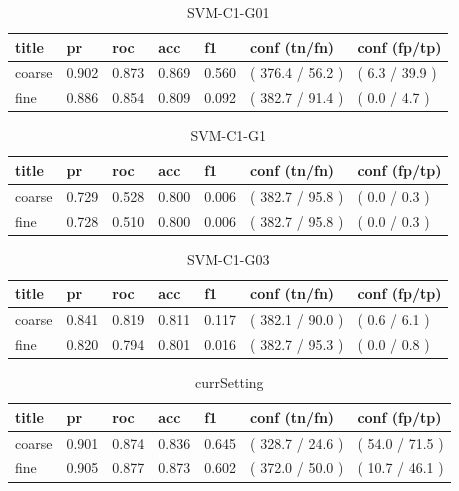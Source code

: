 \documentclass[ms]{nuthesis}
\begin{document}
\FloatBarrier
\begin{table}[h]
\centering
\begin{tabular}{|l||l||l||l||l||l||l|}\toprule
title & pr & roc & acc & f1 & conf (tn/fn) & conf (fp/tp) \\ \midrule
coarse & 0.902 & 0.873 & 0.869 & 0.560 & ( 376.4 / 56.2 ) & ( 6.3 / 39.9 ) \\
fine & 0.886 & 0.854 & 0.809 & 0.092 & ( 382.7 / 91.4 ) & ( 0.0 / 4.7 ) \\ \bottomrule
\end{tabular}
\caption{SVM-C1-G01}
\label{tab:SVM-C1-G01}
\end{table}
\FloatBarrier

\FloatBarrier
\begin{table}[h]
\centering
\begin{tabular}{|l||l||l||l||l||l||l|}\toprule
title & pr & roc & acc & f1 & conf (tn/fn) & conf (fp/tp) \\ \midrule
coarse & 0.729 & 0.528 & 0.800 & 0.006 & ( 382.7 / 95.8 ) & ( 0.0 / 0.3 ) \\
fine & 0.728 & 0.510 & 0.800 & 0.006 & ( 382.7 / 95.8 ) & ( 0.0 / 0.3 ) \\ \bottomrule
\end{tabular}
\caption{SVM-C1-G1}
\label{tab:SVM-C1-G1}
\end{table}
\FloatBarrier

\FloatBarrier
\begin{table}[h]
\centering
\begin{tabular}{|l||l||l||l||l||l||l|}\toprule
title & pr & roc & acc & f1 & conf (tn/fn) & conf (fp/tp) \\ \midrule
coarse & 0.841 & 0.819 & 0.811 & 0.117 & ( 382.1 / 90.0 ) & ( 0.6 / 6.1 ) \\
fine & 0.820 & 0.794 & 0.801 & 0.016 & ( 382.7 / 95.3 ) & ( 0.0 / 0.8 ) \\ \bottomrule
\end{tabular}
\caption{SVM-C1-G03}
\label{tab:SVM-C1-G03}
\end{table}
\FloatBarrier

\FloatBarrier
\begin{table}[h]
\centering
\begin{tabular}{|l||l||l||l||l||l||l|}\toprule
title & pr & roc & acc & f1 & conf (tn/fn) & conf (fp/tp) \\ \midrule
coarse & 0.901 & 0.874 & 0.836 & 0.645 & ( 328.7 / 24.6 ) & ( 54.0 / 71.5 ) \\
fine & 0.905 & 0.877 & 0.873 & 0.602 & ( 372.0 / 50.0 ) & ( 10.7 / 46.1 ) \\ \bottomrule
\end{tabular}
\caption{currSetting}
\label{tab:currSetting}
\end{table}
\FloatBarrier
\end{document}
